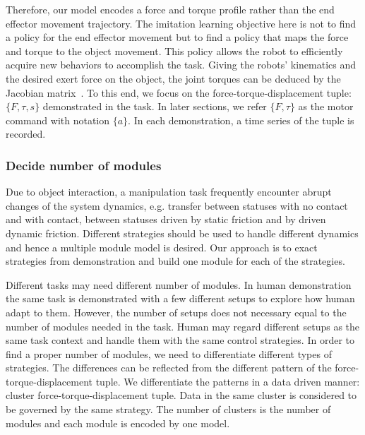 Therefore, our model encodes a force and torque profile rather than the end effector movement trajectory. The imitation learning objective here is not to find a policy for the end effector movement but to find a policy that maps the force and torque to the object movement. This policy allows the robot to efficiently acquire new behaviors to accomplish the task. %
Giving the robots' kinematics and the desired exert force on the object, the joint torques can be deduced by the Jacobian matrix~\cite{okamura2000overview}. To this end, we focus on the force-torque-displacement tuple: $\{F,\tau,s\}$ demonstrated in the task. In later sections, we refer $\{F,\tau\}$ as the motor command with notation $\{a\}$. In each demonstration, a time series of the tuple is recorded.



\subsubsection{Decide number of modules}
\label{sec:cluster}

Due to object interaction, a manipulation task frequently encounter abrupt changes of the system dynamics, e.g. transfer between statuses with no contact and with contact, between statuses driven by static friction and by driven dynamic friction. Different strategies should be used to handle different dynamics and hence a multiple module model is desired. Our approach is to exact strategies from demonstration and build one module for each of the strategies. %


Different tasks may need different number of modules. In human demonstration the same task is demonstrated with a few different setups to explore how human adapt to them. However, the number of setups does not necessary equal to the number of modules needed in the task. Human may regard different setups as the same task context and handle them with the same control strategies. %
In order to find a proper number of modules, we need to differentiate different types of strategies. The differences can be reflected from the different pattern of the force-torque-displacement tuple. We differentiate the patterns in a data driven manner: cluster force-torque-displacement tuple. Data in the same cluster is considered to be governed by the same strategy. The number of clusters is the number of modules and each module is encoded by one model.


